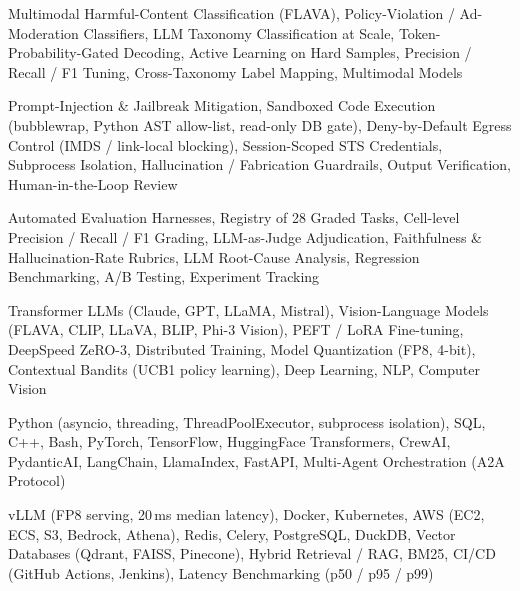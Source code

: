 \documentclass[letter,10pt]{article}
\begin{document}
 Multimodal Harmful-Content Classification (FLAVA), Policy-Violation / Ad-Moderation Classifiers, LLM Taxonomy Classification at Scale, Token-Probability-Gated Decoding, Active Learning on Hard Samples, Precision / Recall / F1 Tuning, Cross-Taxonomy Label Mapping, Multimodal Models\par\vspace{2pt}

 Prompt-Injection \& Jailbreak Mitigation, Sandboxed Code Execution (bubblewrap, Python AST allow-list, read-only DB gate), Deny-by-Default Egress Control (IMDS / link-local blocking), Session-Scoped STS Credentials, Subprocess Isolation, Hallucination / Fabrication Guardrails, Output Verification, Human-in-the-Loop Review\par\vspace{2pt}

 Automated Evaluation Harnesses, Registry of 28 Graded Tasks, Cell-level Precision / Recall / F1 Grading, LLM-as-Judge Adjudication, Faithfulness \& Hallucination-Rate Rubrics, LLM Root-Cause Analysis, Regression Benchmarking, A/B Testing, Experiment Tracking\par\vspace{2pt}

 Transformer LLMs (Claude, GPT, LLaMA, Mistral), Vision-Language Models (FLAVA, CLIP, LLaVA, BLIP, Phi-3 Vision), PEFT / LoRA Fine-tuning, DeepSpeed ZeRO-3, Distributed Training, Model Quantization (FP8, 4-bit), Contextual Bandits (UCB1 policy learning), Deep Learning, NLP, Computer Vision\par\vspace{2pt}

 Python (asyncio, threading, ThreadPoolExecutor, subprocess isolation), SQL, C++, Bash, PyTorch, TensorFlow, HuggingFace Transformers, CrewAI, PydanticAI, LangChain, LlamaIndex, FastAPI, Multi-Agent Orchestration (A2A Protocol)\par\vspace{2pt}

 vLLM (FP8 serving, 20\,ms median latency), Docker, Kubernetes, AWS (EC2, ECS, S3, Bedrock, Athena), Redis, Celery, PostgreSQL, DuckDB, Vector Databases (Qdrant, FAISS, Pinecone), Hybrid Retrieval / RAG, BM25, CI/CD (GitHub Actions, Jenkins), Latency Benchmarking (p50 / p95 / p99)
\end{document}
